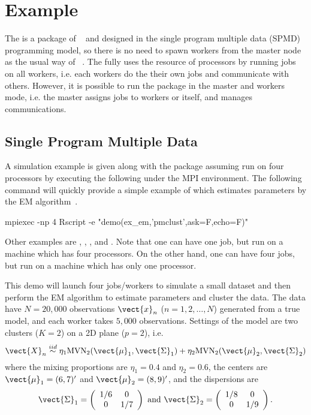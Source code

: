 \section[Examples]{Example}
\label{sec:example}

The  is a package of ~\citep{Rcore} and
designed in the single program multiple data (SPMD)
programming model, so there is no need to spawn workers from the master node
as the usual way of ~\citep{Yu2010}.
The  fully uses the resource
of processors by running jobs on all workers,
i.e. each workers do the their own jobs and communicate with others.
However, it is possible to run the package in the master and workers mode,
i.e. the master assigns jobs to workers or itself, and manages communications.


\subsection[Single Program Multiple Data]{Single Program Multiple Data}
\label{sec:spmd}

A simulation example is given along with the  package
assuming run on four processors by executing the following under the
MPI environment.
The following command will quickly provide a simple example of 
which estimates parameters by the EM algorithm~\citep{Dempster1977}.
\begin{Command}
mpiexec -np 4 Rscript -e "demo(ex_em,'pmclust',ask=F,echo=F)"
\end{Command}
Other examples are , , , and
.
Note that one can have one job, but run on a machine which has four processors.
On the other hand, one can have four jobs, but run on a machine which has only
one processor.

This demo will launch four jobs/workers to simulate a small dataset and then
perform the EM algorithm to estimate parameters and cluster the data.
The data have $N = 20,000$ observations $\vect{x}_n$ ($n = 1, 2, \ldots, N$)
generated from a true model, and each worker takes $5,000$ observations.
Settings of the model are two clusters ($K = 2$)
on a 2D plane ($p = 2$), i.e.
$$
\vect{X}_n \overset{iid}{\sim}
\eta_1 \mbox{MVN}_2(\vect{\mu}_1, \vect{\Sigma}_1) +
\eta_2 \mbox{MVN}_2(\vect{\mu}_2, \vect{\Sigma}_2)
$$
where the mixing proportions are
$\eta_1 = 0.4$ and $\eta_2 = 0.6$, the centers are
$\vect{\mu}_1 = (6, 7)^\prime$ and $\vect{\mu}_2 = (8, 9)^\prime$,
and the dispersions are
$$
\vect{\Sigma}_1 =
\left(
\begin{array}{cc}
1/6 & 0 \\
0   & 1/7 \\
\end{array}
\right)
\mbox{ and }
\vect{\Sigma}_2 =
\left(
\begin{array}{cc}
1/8 & 0 \\
0   & 1/9 \\
\end{array}
\right).
$$

